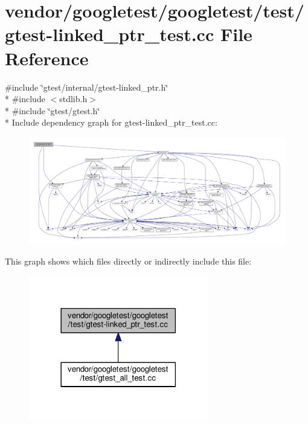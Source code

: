 \hypertarget{gtest-linked__ptr__test_8cc}{}\section{vendor/googletest/googletest/test/gtest-\/linked\+\_\+ptr\+\_\+test.cc File Reference}
\label{gtest-linked__ptr__test_8cc}
{\ttfamily \#include \char`\"{}gtest/internal/gtest-\/linked\+\_\+ptr.\+h\char`\"{}}\\*
{\ttfamily \#include $<$stdlib.\+h$>$}\\*
{\ttfamily \#include \char`\"{}gtest/gtest.\+h\char`\"{}}\\*
Include dependency graph for gtest-\/linked\+\_\+ptr\+\_\+test.cc\+:
\nopagebreak
\begin{figure}[H]
\begin{center}
\leavevmode
\includegraphics[width=350pt]{gtest-linked__ptr__test_8cc__incl}
\end{center}
\end{figure}
This graph shows which files directly or indirectly include this file\+:
\nopagebreak
\begin{figure}[H]
\begin{center}
\leavevmode
\includegraphics[width=222pt]{gtest-linked__ptr__test_8cc__dep__incl}
\end{center}
\end{figure}
